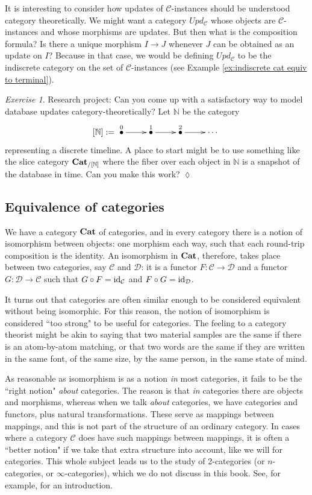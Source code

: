 \documentclass{book}
\def\tn{\textnormal}
\def\mc{\mathcal}
\def\NN{{\mathbb N}}
\def\to{\rightarrow}
\def\taking{\colon}
\newcommand{\LMO}[1]{\stackrel{#1}{\bullet}}
\def\id{\tn{id}}
\def\Cat{{\bf Cat}}
\def\mcC{\mc{C}}
\def\mcD{\mc{D}}
\theoremstyle{remark}
\newtheorem{exc}[subsubsection]{Exercise}
\newenvironment{exercise}{\begin{exc}}{\hspace*{\fill}$\lozenge$\end{exc}}
\theoremstyle{definition}
\begin{document}
It is interesting to consider how updates of $\mcC$-instances should be understood category theoretically. We might want a category $Upd_\mcC$ whose objects are $\mcC$-instances and whose morphisms are updates. But then what is the composition formula? Is there a unique morphism $I\to J$ whenever $J$ can be obtained as an update on $I$? Because in that case, we would be defining $Upd_\mcC$ to be the indiscrete category on the set of $\mcC$-instances (see Example \ref{ex:indiscrete cat equiv to terminal}).

\begin{exercise}
Research project: Can you come up with a satisfactory way to model database updates category-theoretically? Let $\NN$ be the category
$$[\NN]:=\xymatrix{\LMO{0}\ar[r]&\LMO{1}\ar[r]&\LMO{2}\ar[r]&\cdots}$$ 
representing a discrete timeline. A place to start might be to use something like the slice category $\Cat_{/[\NN]}$ where the fiber over each object in $\NN$ is a snapshot of the database in time. Can you make this work?
\end{exercise}



\subsection{Equivalence of categories}\label{sec:equivalence of cats}

We have a category $\Cat$ of categories, and in every category there is a notion of isomorphism between objects: one morphism each way, such that each round-trip composition is the identity. An isomorphism in $\Cat$, therefore, takes place between two categories, say $\mcC$ and $\mcD$: it is a functor $F\taking\mcC\to\mcD$ and a functor $G\taking\mcD\to\mcC$ such that $G\circ F=\id_\mcC$ and $F\circ G=\id_\mcD$. 

It turns out that categories are often similar enough to be considered equivalent without being isomorphic. For this reason, the notion of isomorphism is considered ``too strong" to be useful for categories. The feeling to a category theorist might be akin to saying that two material samples are the same if there is an atom-by-atom matching, or that two words are the same if they are written in the same font, of the same size, by the same person, in the same state of mind. 

As reasonable as isomorphism is as a notion {\em in} most categories, it fails to be the ``right notion" {\em about} categories. The reason is that {\em in} categories there are objects and morphisms, whereas when we talk {\em about} categories, we have categories and functors, plus natural transformations. These serve as mappings between mappings, and this is not part of the structure of an ordinary category. In cases where a category $\mcC$ does have such mappings between mappings, it is often a ``better notion" if we take that extra structure into account, like we will for categories. This whole subject leads us to the study of 2-categories (or $n$-categories, or $\infty$-categories), which we do not discuss in this book. See, for example, \cite{Le1} for an introduction.
\end{document}
